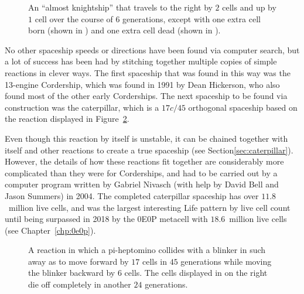 \begin{figure}[!htb]
	\centering
	\caption{An ``almost knightship'' that travels to the right by $2$ cells and up by $1$ cell over the course of $6$ generations, except with one extra cell born (shown in ) and one extra cell dead (shown in ).}\label{fig:almost_knightship}
\end{figure}

No other spaceship speeds or directions have been found via computer search, but a lot of success has been had by stitching together multiple copies of simple reactions in clever ways. The first spaceship that was found in this way was the 13-engine Cordership, which was found in 1991 by Dean Hickerson, who also found most of the other early Corderships. The next spaceship to be found via construction was the caterpillar, which is a $17c/45$ orthogonal spaceship based on the reaction displayed in Figure~\ref{fig:17c45_reaction}.

Even though this reaction by itself is unstable, it can be chained together with itself and other reactions to create a true spaceship (see Section\ref{sec:caterpillar}). However, the details of how these reactions fit together are considerably more complicated than they were for Corderships, and had to be carried out by a computer program written by Gabriel Nivasch (with help by David Bell and Jason Summers) in 2004. The completed caterpillar spaceship has over $11.8$~million live cells, and was the largest interesting Life pattern by live cell count until being surpassed in 2018 by the 0E0P  metacell with $18.6$~million live cells (see Chapter~\ref{chp:0e0p}).

\begin{figure}[!htb]
	\centering
	\caption{A reaction in which a pi-heptomino collides with a blinker in such away as to move forward by $17$ cells in $45$ generations while moving the blinker backward by $6$ cells. The cells displayed in  on the right die off completely in another $24$ generations.}\label{fig:17c45_reaction}
\end{figure}

